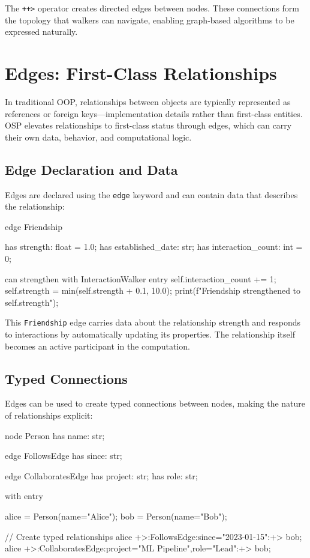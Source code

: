 The \texttt{++>} operator creates directed edges between nodes. These connections form the topology that walkers can navigate, enabling graph-based algorithms to be expressed naturally.

\section{Edges: First-Class Relationships}

In traditional OOP, relationships between objects are typically represented as references or foreign keys—implementation details rather than first-class entities. OSP elevates relationships to first-class status through edges, which can carry their own data, behavior, and computational logic.

\subsection{Edge Declaration and Data}

Edges are declared using the \texttt{edge} keyword and can contain data that describes the relationship:

\begin{jacblock}
edge Friendship {
    has strength: float = 1.0;
    has established_date: str;
    has interaction_count: int = 0;

    can strengthen with InteractionWalker entry {
        self.interaction_count += 1;
        self.strength = min(self.strength + 0.1, 10.0);
        print(f"Friendship strengthened to {self.strength}");
    }
}
\end{jacblock}

This \texttt{Friendship} edge carries data about the relationship strength and responds to interactions by automatically updating its properties. The relationship itself becomes an active participant in the computation.

\subsection{Typed Connections}

Edges can be used to create typed connections between nodes, making the nature of relationships explicit:

\begin{jacblock}
node Person {
    has name: str;
}

edge FollowsEdge {
    has since: str;
}

edge CollaboratesEdge {
    has project: str;
    has role: str;
}

with entry {
    alice = Person(name="Alice");
    bob = Person(name="Bob");

    // Create typed relationships
    alice +>:FollowsEdge:since="2023-01-15":+> bob;
    alice +>:CollaboratesEdge:project="ML Pipeline",role="Lead":+> bob;
}
\end{jacblock}

